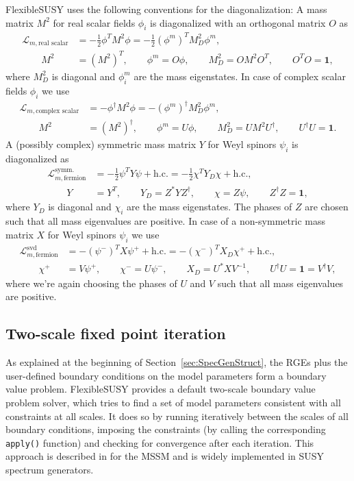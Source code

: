 \documentclass[final,3p,11pt,pdflatex]{elsarticle}
\makeatletter
\newcommand{\fs}{FlexibleSUSY\@\xspace}
\newcommand{\code}[1]{\lstinline|#1|}  %
\newcommand{\Lagr}{\mathcal{L}}
\newcommand{\unity}{\mathbf{1}}
\newcommand{\secref}[1]{Section~\ref{#1}}
\makeatother
\begin{document}
\fs uses the following conventions for the diagonalization: A mass
matrix $M^2$ for real scalar fields $\phi_i$ is diagonalized with an
orthogonal matrix $O$ as
%
\begin{align}
  \Lagr_{m,\text{real scalar}}
  &= - \frac{1}{2} \phi^T M^2 \phi
  = - \frac{1}{2} (\phi^m)^T M^2_D \phi^m, \\
  \qquad M^2 &= (M^2)^T ,
  \qquad \phi^m = O \phi ,
  \qquad M^2_D = O M^2 O^T ,
  \qquad O^T O = \unity ,
\end{align}
%
where $M^2_D$ is diagonal and $\phi^m_i$ are the mass eigenstates.  In
case of complex scalar fields $\phi_i$ we use
%
\begin{align}
  \Lagr_{m,\text{complex scalar}}
  &= - \phi^\dagger M^2 \phi
  = - (\phi^m)^\dagger M^2_D \phi^m, \\
  \qquad M^2 &= (M^2)^\dagger ,
  \qquad \phi^m = U \phi ,
  \qquad M^2_D = U M^2 U^\dagger ,
  \qquad U^\dagger U = \unity .
\end{align}
%
A (possibly complex) symmetric mass matrix $Y$ for Weyl spinors
$\psi_i$ is diagonalized as
%
\begin{align}
  \Lagr_{m,\text{fermion}}^\text{symm.}
  &= - \frac{1}{2} \psi^T Y \psi + \text{h.c.}
  = - \frac{1}{2} \chi^T Y_D \chi + \text{h.c.}, \\
  \qquad Y &= Y^T ,
  \qquad Y_D = Z^* Y Z^\dagger ,
  \qquad \chi = Z \psi ,
  \qquad Z^\dagger Z = \unity ,
\end{align}
%
where $Y_D$ is diagonal and $\chi_i$ are the mass eigenstates.  The
phases of $Z$ are chosen such that all mass eigenvalues are positive.
In case of a non-symmetric mass matrix $X$ for Weyl spinors $\psi_i$
we use
%
\begin{align}
  \Lagr_{m,\text{fermion}}^\text{svd}
  &= - (\psi^-)^T X \psi^+ + \text{h.c.}
  = - (\chi^-)^T X_D \chi^+ + \text{h.c.}, \\
  \qquad \chi^+ &= V \psi^+ ,
  \qquad \chi^- = U \psi^- ,
  \qquad X_D = U^* X V^{-1} ,
  \qquad U^\dagger U = \unity = V^\dagger V ,
\end{align}
%
where we're again choosing the phases of $U$ and $V$ such that all mass
eigenvalues are positive.

\subsection{Two-scale fixed point iteration}
\label{sec:TwoScaleFixedPointIteration}

As explained at the beginning of \secref{sec:SpecGenStruct}, the RGEs
plus the user-defined boundary conditions on the model parameters form
a boundary value problem.  \fs provides a default two-scale boundary
value problem solver, which tries to find a set of model parameters
consistent with all constraints at all scales.  It does so by running
iteratively between the scales of all boundary conditions, imposing
the constraints (by calling the corresponding \code{apply()} function)
and checking for convergence after each iteration.  This approach is
described in \cite{Barger:1993gh} for the MSSM and is widely
implemented in SUSY spectrum generators.
\end{document}
